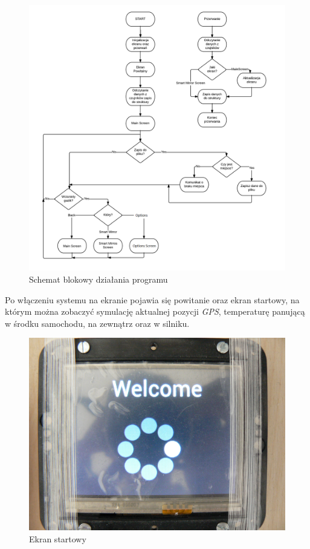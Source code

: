 \documentclass{xmgr}
\begin{document}
\begin{figure}[!hp]
    \centering
    	\includegraphics[height=0.58\textheight]{images/codeDiagram.png}
    \caption{Schemat blokowy działania programu}
\end{figure}

Po włączeniu systemu na ekranie pojawia się powitanie oraz ekran startowy, na którym można zobaczyć symulację aktualnej pozycji \emph{GPS}, temperaturę panującą w środku samochodu, na zewnątrz oraz w silniku. 

\begin{figure}[!h]
    \centering
    	\includegraphics[height=0.4\textheight]{images/start.JPG}
    \caption{Ekran startowy}
\end{figure} 
\end{document}
